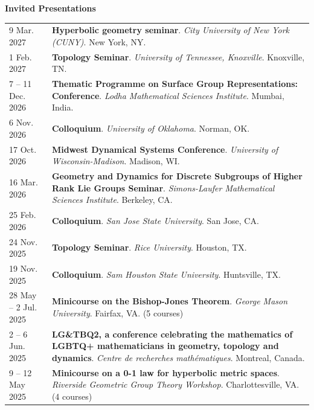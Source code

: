 
    \medskip


    \medskip
    \medskip



    \textbf{\large Invited Presentations}
    
    \begin{center}
    {
    \renewcommand{\arraystretch}{1.5}
    \begin{longtable}{p{}  p{}}
    9 Mar.  2027 & \textbf{Hyperbolic geometry seminar}. \textit{City University of New York (CUNY)}.  New York, NY.  \\ 
1 Feb.  2027 & \textbf{Topology Seminar}. \textit{University of Tennessee, Knoxville}.  Knoxville, TN.  \\ 
7  -- 11 Dec.  2026 & \textbf{Thematic Programme on Surface Group Representations: Conference}. \textit{Lodha Mathematical Sciences Institute}.  Mumbai, India.  \\ 
6 Nov.  2026 & \textbf{Colloquium}. \textit{University of Oklahoma}.  Norman, OK.  \\ 
17 Oct.  2026 & \textbf{Midwest Dynamical Systems Conference}. \textit{University of Wisconsin-Madison}.  Madison, WI.  \\ 
16 Mar.  2026 & \textbf{Geometry and Dynamics for Discrete Subgroups of Higher Rank Lie Groups Seminar}. \textit{Simons-Laufer Mathematical Sciences Institute}.  Berkeley, CA.  \\ 
25 Feb.  2026 & \textbf{Colloquium}. \textit{San Jose State University}.  San Jose, CA.  \\ 
24 Nov.  2025 & \textbf{Topology Seminar}. \textit{Rice University}.  Houston, TX.  \\ 
19 Nov.  2025 & \textbf{Colloquium}. \textit{Sam Houston State University}.  Huntsville, TX.  \\ 
28 May  -- 2 Jul.  2025 & \textbf{Minicourse on the Bishop-Jones Theorem}. \textit{George Mason University}.  Fairfax, VA. (5 courses) \\ 
2  -- 6 Jun.  2025 & \textbf{LG\&TBQ2, a conference celebrating the mathematics of LGBTQ+ mathematicians in geometry, topology and dynamics}. \textit{Centre de recherches math\'ematiques}.  Montreal, Canada.  \\ 
9  -- 12 May  2025 & \textbf{Minicourse on a 0-1 law for hyperbolic metric spaces}. \textit{Riverside Geometric Group Theory Workshop}.  Charlottesville, VA. (4 courses) \\ 

\end{longtable}}
\end{center}
